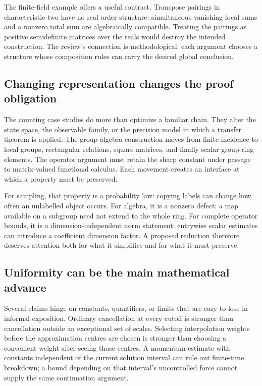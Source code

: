 The finite-field example offers a useful contrast. Transpose pairings in
characteristic two have no real order structure: simultaneous vanishing
local sums and a nonzero total sum are algebraically compatible. Treating
the pairings as positive semidefinite matrices over the reals would destroy
the intended construction. The review's connection is methodological:
each argument chooses a structure whose composition rules can carry the
desired global conclusion.

\subsection{Changing representation changes the proof obligation}
The counting case studies do more than optimize a familiar chain. They
alter the state space, the observable family, or the precision model in
which a transfer theorem is applied. The group-algebra construction moves
from finite incidence to local groups, rectangular relations, square
matrices, and finally scalar group-ring elements. The operator argument
must retain the sharp constant under passage to matrix-valued functional
calculus. Each movement creates an interface at which a property must be
preserved.

For sampling, that property is a probability law: copying labels can
change how often an unlabelled object occurs. For algebra, it is a
nonzero defect: a map available on a subgroup need not extend to the
whole ring. For complete operator bounds, it is a dimension-independent
norm statement: entrywise scalar estimates can introduce a coefficient
dimension factor. A proposed reduction therefore deserves attention both
for what it simplifies and for what it must preserve.

\subsection{Uniformity can be the main mathematical advance}
Several claims hinge on constants, quantifiers, or limits that are easy to
lose in informal exposition. Ordinary cancellation at every cutoff is
stronger than cancellation outside an exceptional set of scales. Selecting
interpolation weights before the approximation centres are chosen is
stronger than choosing a convenient weight after seeing those centres.
A momentum estimate with constants independent of the current solution
interval can rule out finite-time breakdown; a bound depending on that
interval's uncontrolled force cannot supply the same continuation argument.

